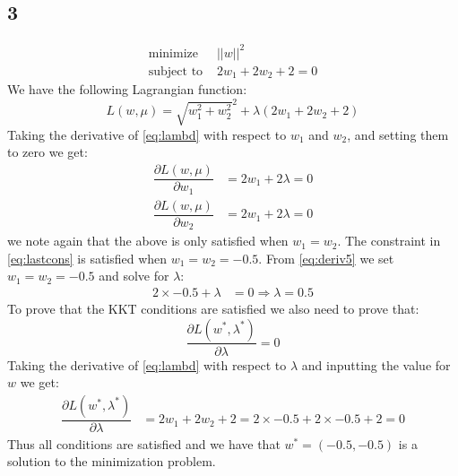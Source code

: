 \documentclass{article}
\begin{document}
\subsection{3}
\begin{align}
\text{minimize } &||w||^2 \\
\label{eq:lastcons}
\text{subject to } &2w_1 + 2w_2 + 2 = 0
\end{align}
We have the following Lagrangian function:
\begin{equation}
\label{eq:lambd}
L(w,\mu) = \sqrt{w_1^2 + w_2^2}^2 + \lambda(2w_1 + 2w_2 + 2)
\end{equation}
Taking the derivative of \eqref{eq:lambd} with respect to $w_1$ and $w_2$, and setting them to zero we get:
\begin{align}
\label{eq:deriv5}
\dfrac{\partial L (w, \mu)}{\partial w_1} &= 2 w_1 + 2 \lambda = 0 \\
\label{eq:deriv6}
\dfrac{\partial L (w, \mu)}{\partial w_2} &= 2 w_1 + 2 \lambda = 0
\end{align}
we note again that the above is only satisfied when $w_1 = w_2$. The constraint in \eqref{eq:lastcons} is satisfied when $w_1 = w_2 = -0.5$.
From \eqref{eq:deriv5} we set $w_1=w_2=-0.5$ and solve for $\lambda$:
\begin{align}
2 \times -0.5 + \lambda &= 0 \Rightarrow \lambda = 0.5
\end{align}
To prove that the KKT conditions are satisfied we also need to prove that:
\begin{equation}
\dfrac{\partial L (w^*, \lambda^*)}{\partial \lambda} = 0
\end{equation}
Taking the derivative of \eqref{eq:lambd} with respect to $\lambda$ and inputting the value for $w$ we get:
\begin{align}
\dfrac{\partial L (w^*, \lambda^*)}{\partial \lambda} &= 2w_1 + 2w_2 + 2 = 2\times -0.5 + 2 \times -0.5 + 2 = 0
\end{align}
Thus all conditions are satisfied and we have that $w^* = (-0.5,-0.5)$ is a solution to the minimization problem.
\end{document}
